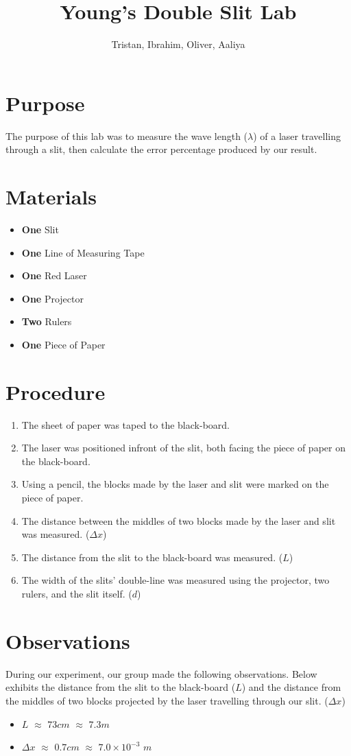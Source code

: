 \documentclass{article}
\title{Young's Double Slit Lab}
\author{Tristan, Ibrahim, Oliver, Aaliya}
\begin{document}
\maketitle
\section*{Purpose} {
    The purpose of this lab was to measure the wave length ($\lambda$) of a laser travelling through a slit, then calculate the error percentage produced by our result.
}
\section*{Materials} {
    \begin{itemize}
        \item {\textbf{One} Slit}
        \item {\textbf{One} Line of Measuring Tape}
        \item {\textbf{One} Red Laser}
        \item {\textbf{One} Projector}
        \item {\textbf{Two} Rulers}
        \item {\textbf{One} Piece of Paper}
    \end{itemize}\leavevmode
}
\section*{Procedure} {
    \begin{enumerate}
        \item {The sheet of paper was taped to the black-board.}
        \item {The laser was positioned infront of the slit, both facing the piece of paper on the black-board.}
        \item {Using a pencil, the blocks made by the laser and slit were marked on the piece of paper.}
        \item {The distance between the middles of two blocks made by the laser and slit was measured. ($\Delta x$)}
        \item {The distance from the slit to the black-board was measured. ($L$)}
        \item {The width of the slits' double-line was measured using the projector, two rulers, and the slit itself. ($d$)}
    \end{enumerate}\leavevmode
}
\section*{Observations} {
    During our experiment, our group made the following observations. Below exhibits the distance from the slit to the black-board ($L$) and the distance from the middles of two blocks projected by the laser travelling through our slit. ($\Delta x$)
    \begin{itemize}
        \item {$L$ $\approx$ $73cm$ $\approx$ $7.3m$}
        \item {$\Delta x$ $\approx$ $0.7cm$ $\approx$ $7.0\times 10^{-3}$ $m$}
    \end{itemize}\leavevmode
}
\end{document}
